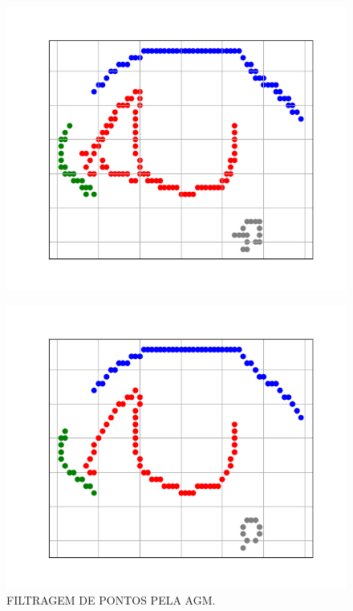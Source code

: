 \begin{figure}[h!]
    \caption{FILTRAGEM DE PONTOS PELA AGM.}
    \centering
    \begin{minipage}[t]{0.32\textwidth}
        \centering
        \includegraphics[width=\linewidth]{fig/04_connected_components_right_eye.png}
        \label{fig:olho-grafo}
    \end{minipage}
    \hfill
    \begin{minipage}[t]{0.32\textwidth}
        \centering
        \includegraphics[width=\linewidth]{fig/05_longest_path_right_eye.png}

\end{minipage}
\end{figure}
